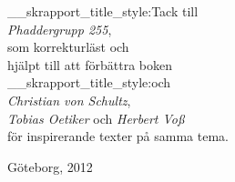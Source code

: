 \documentclass[lang=sv,ptsize=10pt,font=none,nomath,titles=bf,../../a4.tex]{subfiles}
\begin{document}
\pagestyle{empty}

\begin{titlepage} %
	\maketitle
	\begin{abstract}
		En inkomplett guide till att skriva och typsätta \LaTeX-dokument riktad
		till studenter på Chalmers Tekniska Högskola, specifikt programmen
		Teknisk Matematik och Teknisk Fysik.
		Inspiration har tagits från bland annat  och
		, men främst från .
	\end{abstract}
\end{titlepage} %
\cleardoublepage

\begin{center} %
	\large\vspace*{36pt}

	{\csname__skrapport_title_style:\endcsname\Large Tack till}\\[1ex]
	\emph{Phaddergrupp 255},\\
	som korrekturläst och\\
	hjälpt till att förbättra boken\\[1ex]
	{\csname__skrapport_title_style:\endcsname\Large och}\\[1ex]
	\emph{Christian von Schultz},\\
	\emph{Tobias Oetiker} och \emph{Herbert Voß}\\
	för inspirerande texter på samma tema.
	\vfill 
	
	\small
	Göteborg, 2012
\end{center}
\end{document}

